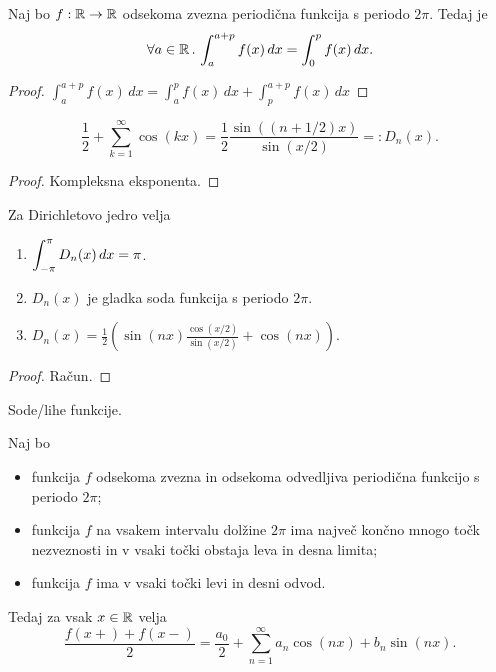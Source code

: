 \begin{lema}
    Naj bo \(f: \mathbb{R} \to \mathbb{R}\) odsekoma zvezna periodična funkcija s periodo \(2\pi\). Tedaj je 
    \[
         \forall a \in \mathbb{R} \,.\, \int_{a}^{a+p} f(x) \, dx = \int_{0}^{p}  f(x) \, dx.
    \]
\end{lema}

\begin{proof}
    \(\int_{a}^{a+p} f(x) \, dx = \int_{a}^{p} f(x) \, dx + \int_{p}^{a+p} f(x) \, dx\)
\end{proof}

\begin{lema}
    \[\frac{1}{2} + \sum_{k=1}^{\infty} \cos(kx) = \frac{1}{2} \frac{\sin((n+1/2)x)}{\sin(x/2)} =: D_n(x).\]
\end{lema}

\begin{proof}
    Kompleksna eksponenta.
\end{proof}

\begin{lema}
    Za Dirichletovo jedro velja
    \begin{enumerate}
        \item \(\displaystyle \int_{-\pi}^{\pi} D_n(x) \, dx = \pi\).
        \item \(D_n(x)\) je gladka soda funkcija s periodo \(2\pi\).
        \item \(D_n(x) = \frac{1}{2} \left(\sin(nx)\frac{\cos(x/2)}{\sin(x/2)}  + \cos(nx)\right)\).
    \end{enumerate}
\end{lema}

\begin{proof}
    Račun.
\end{proof}

\begin{opomba}
    Sode/lihe funkcije. \todo{}
\end{opomba}

\begin{izrek}
    Naj bo
    \begin{itemize}
        \item funkcija \(f\) odsekoma zvezna in odsekoma odvedljiva periodična funkcijo s periodo \(2\pi\);
        \item funkcija \(f\) na vsakem intervalu dolžine \(2\pi\) ima največ končno mnogo točk nezveznosti in v vsaki točki obstaja leva in desna limita;
        \item funkcija \(f\) ima v vsaki točki levi in desni odvod.
    \end{itemize}
    Tedaj za vsak \(x \in \mathbb{R}\) velja 
    \[
        \frac{f(x+) + f(x-)}{2} = \frac{a_0}{2} + \sum_{n=1}^{\infty} a_n \cos(nx) + b_n \sin(nx).
    \]
\end{izrek}

